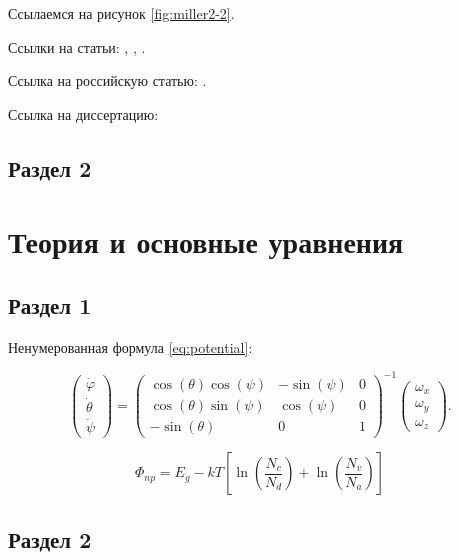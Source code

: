 \documentclass[a4paper,14pt]{extarticle}
\begin{document}
Ссылаемся на рисунок \ref{fig:miller2-2}.

Ссылки на статьи: \cite{miller1}, \cite{miller2}, \cite{mohseni1}.

Ссылка на российскую статью: \cite{skubachevskii1}.

Ссылка на диссертацию:  \cite{pavlichenko1}

\subsection{Раздел 2}

\pagebreak
\section{Теория и основные уравнения}

\subsection{Раздел 1}

Ненумерованная формула \ref{eq:potential}:

\begin{equation}
    \begin{pmatrix} \dot{\varphi}\\ \dot{\theta} \\ \dot{\psi} \end{pmatrix}
    = \begin{pmatrix}
        \cos(\theta)\cos(\psi) & -\sin(\psi) & 0 \\
        \cos(\theta)\sin(\psi) & \cos(\psi)  & 0 \\
        -\sin(\theta)          & 0           & 1
    \end{pmatrix}^{-1}
    \begin{pmatrix} \omega_x\\ \omega_y \\ \omega_z \end{pmatrix}. \nonumber
\end{equation}

\begin{equation}
    \label{eq:potential}
    \Phi_{np}=E_{g}-kT\left[\ln\left(\frac{N_{c}}{N_{d}}\right)+\ln\left(\frac{N_{v}}{N_{a}}\right)\right]
\end{equation}


\subsection{Раздел 2}
\end{document}
